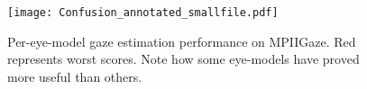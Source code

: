

\begin{figure}
    \centering
    \texttt{[image: Confusion\_annotated\_smallfile.pdf]}
    \caption{Per-eye-model gaze estimation performance on MPIIGaze. Red represents worst scores. Note how some eye-models have proved more useful than others.
    }
    \label{fig:person_specific_training}
\end{figure}


